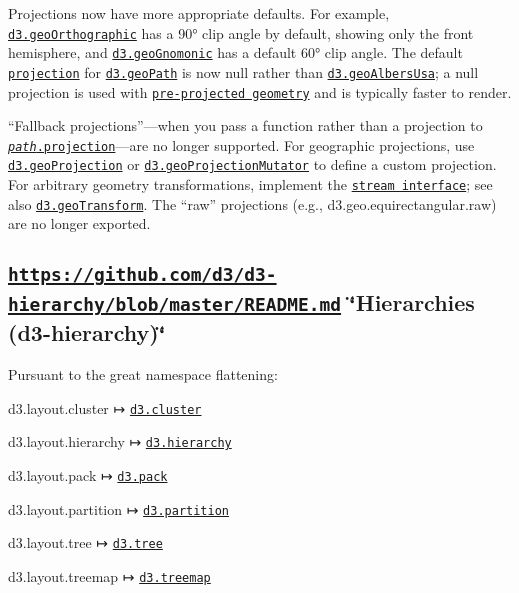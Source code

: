 Projections now have more appropriate defaults. For example, \href{https://github.com/d3/d3-geo/blob/master/README.md#geoOrthographic}{\tt d3.\+geo\+Orthographic} has a 90° clip angle by default, showing only the front hemisphere, and \href{https://github.com/d3/d3-geo/blob/master/README.md#geoGnomonic}{\tt d3.\+geo\+Gnomonic} has a default 60° clip angle. The default \href{https://github.com/d3/d3-geo/blob/master/README.md#path_projection}{\tt projection} for \href{https://github.com/d3/d3-geo/blob/master/README.md#geoPath}{\tt d3.\+geo\+Path} is now null rather than \href{https://github.com/d3/d3-geo/blob/master/README.md#geoAlbersUsa}{\tt d3.\+geo\+Albers\+Usa}; a null projection is used with \href{https://bl.ocks.org/mbostock/5557726}{\tt pre-\/projected geometry} and is typically faster to render.

“\+Fallback projections”—when you pass a function rather than a projection to \href{https://github.com/d3/d3-geo/blob/master/README.md#path_projection}{\tt {\itshape path}.projection}—are no longer supported. For geographic projections, use \href{https://github.com/d3/d3-geo/blob/master/README.md#geoProjection}{\tt d3.\+geo\+Projection} or \href{https://github.com/d3/d3-geo/blob/master/README.md#geoProjectionMutator}{\tt d3.\+geo\+Projection\+Mutator} to define a custom projection. For arbitrary geometry transformations, implement the \href{https://github.com/d3/d3-geo/blob/master/README.md#streams}{\tt stream interface}; see also \href{https://github.com/d3/d3-geo/blob/master/README.md#geoTransform}{\tt d3.\+geo\+Transform}. The “raw” projections (e.\+g., d3.\+geo.\+equirectangular.\+raw) are no longer exported.

\subsection*{\href{https://github.com/d3/d3-hierarchy/blob/master/README.md}{\tt https\+://github.\+com/d3/d3-\/hierarchy/blob/master/\+R\+E\+A\+D\+M\+E.\+md} \char`\"{}\+Hierarchies (d3-\/hierarchy)\char`\"{}}

Pursuant to the great namespace flattening\+:


\begin{DoxyItemize}
\item d3.\+layout.\+cluster ↦ \href{https://github.com/d3/d3-hierarchy/blob/master/README.md#cluster}{\tt d3.\+cluster}
\item d3.\+layout.\+hierarchy ↦ \href{https://github.com/d3/d3-hierarchy/blob/master/README.md#hierarchy}{\tt d3.\+hierarchy}
\item d3.\+layout.\+pack ↦ \href{https://github.com/d3/d3-hierarchy/blob/master/README.md#pack}{\tt d3.\+pack}
\item d3.\+layout.\+partition ↦ \href{https://github.com/d3/d3-hierarchy/blob/master/README.md#partition}{\tt d3.\+partition}
\item d3.\+layout.\+tree ↦ \href{https://github.com/d3/d3-hierarchy/blob/master/README.md#tree}{\tt d3.\+tree}
\item d3.\+layout.\+treemap ↦ \href{https://github.com/d3/d3-hierarchy/blob/master/README.md#treemap}{\tt d3.\+treemap}
\end{DoxyItemize}

